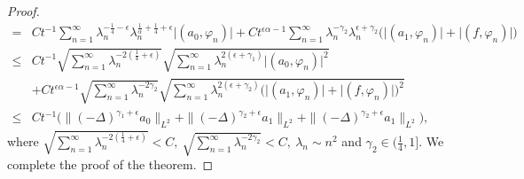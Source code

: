 \documentclass[11pt]{article}
\numberwithin{equation}{section}
\begin{document}
\begin{proof}
\begin{align*}
=& Ct^{-1}\sum_{n=1}^{\infty}\lambda_n^{-\frac14-\epsilon}\lambda_n^{\frac{1}{\alpha}+\frac14+\epsilon}\big|(a_0, \varphi_n) \big| +Ct^{\epsilon\alpha-1}\sum_{n=1}^{\infty}\lambda_n^{-\gamma_2}\lambda_n^{\epsilon+\gamma_2}\Big (\big|(a_1, \varphi_n) \big|+\big|(f, \varphi_n )\big|\Big)\\
\le & Ct^{-1}\sqrt{\sum_{n=1}^{\infty}\lambda_n^{-2(\frac14+\epsilon)}}\sqrt{\sum_{n=1}^{\infty}\lambda_n^{2(\epsilon+\gamma_1)}\big|(a_0, \varphi_n) \big|^2} \\ &+Ct^{\epsilon\alpha-1}\sqrt{\sum_{n=1}^{\infty}\lambda_n^{-2\gamma_2}}\sqrt{\sum_{n=1}^{\infty}\lambda_n^{2(\epsilon+\gamma_2)}\Big (\big|(a_1, \varphi_n) \big|+\big|(f, \varphi_n )\big|\Big)^2}\\
\le& Ct^{-1}\Big(\|(-\Delta)^{\gamma_1+\epsilon}a_0\|_{L^2}+\|(-\Delta)^{\gamma_2+\epsilon}a_1\|_{L^2}+\|(-\Delta)^{\gamma_2+\epsilon}a_1\|_{L^2}\Big),
\end{align*}
where $\sqrt{\sum_{n=1}^{\infty}\lambda_n^{-2(\frac14+\epsilon)}}<C,~\sqrt{\sum_{n=1}^{\infty}\lambda_n^{-2\gamma_2}}<C,~\lambda_n \sim n^2$ and $\gamma_2\in(\frac{1}{4},1]$. We complete the proof of the theorem.
\end{proof}
\fi
\end{document}
